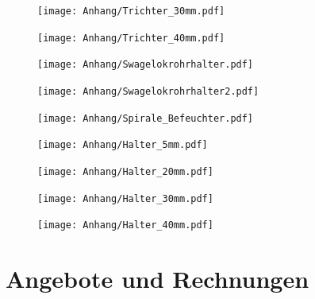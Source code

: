 \begin{figure}
	\texttt{[image: Anhang/Trichter\_30mm.pdf]}
\end{figure}

\begin{figure}  
	\texttt{[image: Anhang/Trichter\_40mm.pdf]}
\end{figure}

\begin{figure}  
	\texttt{[image: Anhang/Swagelokrohrhalter.pdf]}
\end{figure}

\begin{figure}  
	\texttt{[image: Anhang/Swagelokrohrhalter2.pdf]}
\end{figure}

\begin{figure}  
	\texttt{[image: Anhang/Spirale\_Befeuchter.pdf]}
\end{figure}

\begin{figure}  
	\texttt{[image: Anhang/Halter\_5mm.pdf]}
\end{figure}

\begin{figure}  
	\texttt{[image: Anhang/Halter\_20mm.pdf]}
\end{figure}

\begin{figure}  
	\texttt{[image: Anhang/Halter\_30mm.pdf]}
\end{figure}

\begin{figure}  
	\texttt{[image: Anhang/Halter\_40mm.pdf]}
\end{figure}


\clearpage


\section*{Angebote und Rechnungen}








